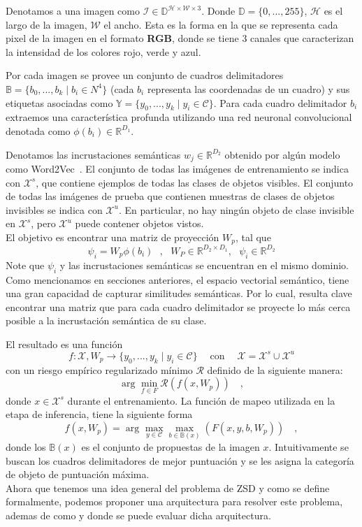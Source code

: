 Denotamos a una imagen como $\mathcal{I} \in \mathbb{D}^{\mathcal{H} \times \mathcal{W} \times 3}$. Donde $\mathbb{D} = \{0,...,255\}$, $\mathcal{H}$  es el largo de la imagen, $\mathcal{W}$ el ancho. Esta es la forma en la que se representa cada pixel de la imagen en el formato \textbf{RGB}, donde se tiene 3 canales que caracterizan la intensidad de los colores rojo, verde y azul. 

Por cada imagen se provee un conjunto de cuadros delimitadores $\mathbb{B} = \{b_0,...,b_k\mid b_i \in N^4\}$ (cada $b_i$ representa las coordenadas de un cuadro) y sus etiquetas asociadas como $\mathbb{Y} = \{y_0,...,y_k\mid y_i \in \mathcal{C}\}$. Para cada cuadro delimitador $b_i$ extraemos una característica profunda utilizando una red neuronal convolucional denotada como $\phi(b_i) \in \mathbb{R}^{D_1}$. 

Denotamos las incrustaciones semánticas $w_j \in \mathbb{R}^{D_2}$ obtenido por algún modelo como Word2Vec~\cite{mikolov2013distributed}. El conjunto de todas las imágenes de entrenamiento se indica con $\mathcal{X}^s$, que contiene ejemplos de todas las clases de objetos visibles.  El conjunto de todas las imágenes de prueba que contienen muestras de clases de objetos invisibles se indica con  $\mathcal{X}^u$. En particular, no hay ningún objeto de clase invisible en $\mathcal{X}^s$, pero $\mathcal{X}^u$ puede contener objetos vistos.\\

El objetivo es encontrar una matriz de proyección $W_p$, tal que 
\[ \psi_i = W_p\phi(b_i) \:\:\:,\:\:\: W_P \in \mathbb{R}^{D_2 \times D_1},\:\:\: \psi_i \in \mathbb{R}^{D_2} \] 
Note que $\psi_i$ y las incrustaciones semánticas se encuentran en el mismo dominio. Como mencionamos en secciones anteriores, el espacio vectorial semántico, tiene una gran capacidad de capturar similitudes semánticas. Por lo cual, resulta clave encontrar una matriz que para cada cuadro delimitador se proyecte lo más cerca posible a la incrustación semántica de su clase. 

El resultado es una función 
\[f : \mathcal{X}, W_p  \to \{y_0,...,y_k\mid y_i \in \mathcal{C}\} \quad \operatorname{con}\quad \mathcal{X} =  \mathcal{X}^s \cup \mathcal{X}^u\] 
con un riesgo empírico regularizado mínimo $\mathcal{R}$ definido de la siguiente manera: 
\[ \arg_{}\min_{f \in F} \mathcal{R}(f(x,W_p))\quad, \] 
donde $x \in \mathcal{X}^s$ durante el entrenamiento. La función de mapeo utilizada en la etapa de inferencia, tiene la siguiente forma \[ f(x,W_p) = \arg_{}\max_{y \in \mathcal{C}}\max_{b \in \mathbb{B}(x)} (F(x,y,b,W_p)) \quad,\] donde los $\mathbb{B}(x)$ es el conjunto de propuestas de la imagen $x$. Intuitivamente se buscan los cuadros delimitadores de mejor puntuación y se les asigna la categoría de objeto de puntuación máxima.\\

Ahora que tenemos una idea general del problema de ZSD y como se define formalmente, podemos proponer una arquitectura para resolver este problema, ademas de como y donde se puede evaluar dicha arquitectura.